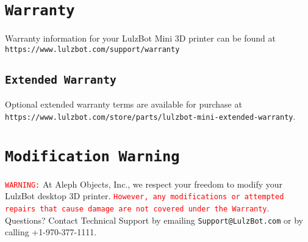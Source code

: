 %
%
%
%
%

\section{\texttt{Warranty}}
Warranty information for your LulzBot Mini 3D printer can be found at \texttt{https://www.lulzbot.com/support/warranty}

\subsection{\texttt{Extended Warranty}}
Optional extended warranty terms are available for purchase at \texttt{https://www.lulzbot.com/store/parts/lulzbot-mini-extended-warranty}.

\section{\texttt{Modification Warning}}
\textcolor{red}{\texttt{WARNING:}} At Aleph Objects, Inc., we respect your freedom to modify your LulzBot desktop 3D printer. \textcolor{red}{\texttt{However, any modifications or attempted repairs that cause damage are not covered under the Warranty}}. Questions? Contact Technical Support by emailing \texttt{Support@LulzBot.com} or by calling +1-970-377-1111.
